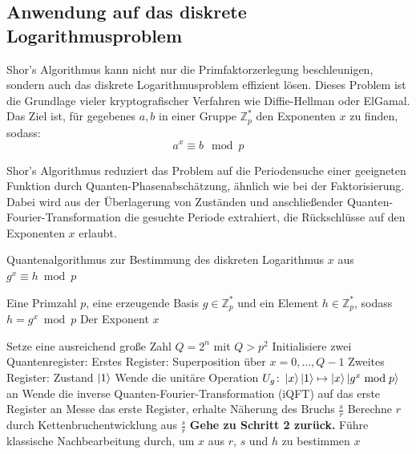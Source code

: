 \subsection{Anwendung auf das diskrete Logarithmusproblem}

Shor’s Algorithmus kann nicht nur die Primfaktorzerlegung beschleunigen, sondern auch das diskrete Logarithmusproblem effizient lösen. Dieses Problem ist die Grundlage vieler kryptografischer Verfahren wie Diffie-Hellman oder ElGamal. \\

\noindent Das Ziel ist, für gegebenes \( a, b \) in einer Gruppe \( \mathbb{Z}_p^* \) den Exponenten \( x \) zu finden, sodass:
\[
a^x \equiv b \mod p
\]

\noindent Shor’s Algorithmus reduziert das Problem auf die Periodensuche einer geeigneten Funktion durch Quanten-Phasenabschätzung, ähnlich wie bei der Faktorisierung. Dabei wird aus der Überlagerung von Zuständen und anschließender Quanten-Fourier-Transformation die gesuchte Periode extrahiert, die Rückschlüsse auf den Exponenten \( x \) erlaubt.\\

\begin{algorithm}[H]
\caption{Quantenalgorithmus zur Bestimmung des diskreten Logarithmus \( x \) aus \( g^x \equiv h \bmod p \)}
\begin{algorithmic}[1]
\Require Eine Primzahl \( p \), eine erzeugende Basis \( g \in \mathbb{Z}_p^* \) und ein Element \( h \in \mathbb{Z}_p^* \), sodass \( h = g^x \bmod p \)
\Ensure Der Exponent \( x \)

\State Setze eine ausreichend große Zahl \( Q = 2^n \) mit \( Q > p^2 \)
\State Initialisiere zwei Quantenregister:
\State \hspace{1em} Erstes Register: Superposition über \( x = 0, \ldots, Q-1 \)
\State \hspace{1em} Zweites Register: Zustand \( \ket{1} \)
\State Wende die unitäre Operation \( U_g \colon \ket{x}\ket{1} \mapsto \ket{x}\ket{g^x \bmod p} \) an
\State Wende die inverse Quanten-Fourier-Transformation (iQFT) auf das erste Register an
\State Messe das erste Register, erhalte Näherung des Bruchs \( \frac{s}{r} \)
\State Berechne \( r \) durch Kettenbruchentwicklung aus \( \frac{s}{r} \)
  \State \textbf{Gehe zu Schritt 2 zurück.}
\EndIf
\State Führe klassische Nachbearbeitung durch, um \( x \) aus \( r \), \( s \) und \( h \) zu bestimmen
\State \Return \( x \)
\end{algorithmic}
\end{algorithm}

